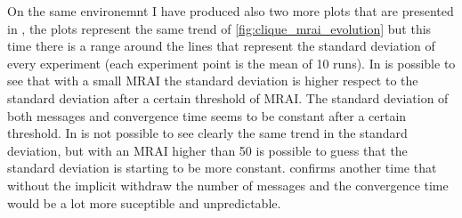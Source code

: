 \documentclass[10pt,conference,letterpaper]{IEEEtran}
\begin{document}
On the same environemnt I have produced also two more plots that are presented
in , the plots represent the same trend of
\cref{fig:clique_mrai_evolution} but this time there is a range around 
the lines that represent the standard deviation of every experiment (each experiment
point is the mean of 10 runs).
In  is possible to see that with a small
\ac{MRAI} the standard deviation is higher respect to the standard deviation
after a certain threshold of \ac{MRAI}.
The standard deviation of both messages and convergence time seems to be constant
after a certain threshold.
In  is not possible to see clearly the
same trend in the standard deviation, but with an \ac{MRAI} higher than \num{50}
is possible to guess that the standard deviation is starting to be more constant.
 confirms another time that 
without the implicit withdraw the number of messages and the convergence time
would be a lot more suceptible and unpredictable.
\end{document}
